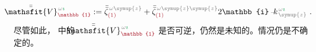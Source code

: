 \begin{align} \label{eq:plane_wave_basis-V1-nokxky}
	\Xint{\mathcolor{gray}{-}}{25}{\bar{\bar{\mathsfit{V}}}}^{\;\! \mathcolor{gray}{\omega} \textcolor{ForestGreen}{\imath}}_{\textcolor{Maroon}{\mathbb{1}}} := \bar{\bar{\zeta}}^{\;\! \mathcolor{gray}{\omega} \mathcolor{gray}{\symup{z}}}_{\textcolor{Maroon}{(1)}} + \bar{\bar{\zeta}}^{\;\! \mathcolor{gray}{\omega} \mathcolor{gray}{\symup{z} \symup{z}}}_{\textcolor{Maroon}{(1)}} 2\mathbb{i} \Xint{\begin{smallmatrix} ~ \\ {}^{}_{\mathcolor{gray}{-}} \\ ~ \end{smallmatrix}}{15}{k}_{\;\! \mathcolor{gray}{\symup{z}}}^{\;\! \mathcolor{gray}{\omega} \textcolor{ForestGreen}{\imath}} ~.
\end{align}
尽管如此， 中的 $\Xint{\mathcolor{gray}{-}}{25}{\bar{\bar{\mathsfit{V}}}}^{\;\! \mathcolor{gray}{\omega} \textcolor{ForestGreen}{\imath}}_{\textcolor{Maroon}{\mathbb{1}}}$ 是否可逆，仍然是未知的。情况仍是不确定的。

